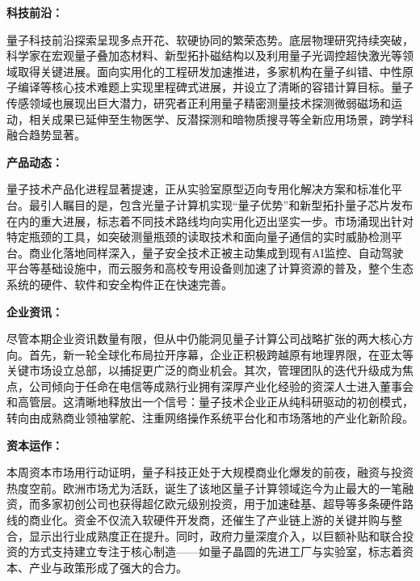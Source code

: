 \documentclass[12pt,a4paper]{ctexart}
\begin{document}
\textbf{ 科技前沿：}

量子科技前沿探索呈现多点开花、软硬协同的繁荣态势。底层物理研究持续突破，科学家在宏观量子叠加态材料、新型拓扑磁结构以及利用量子光调控超快激光等领域取得关键进展。面向实用化的工程研发加速推进，多家机构在量子纠错、中性原子编译等核心技术难题上实现里程碑式进展，并设立了清晰的容错计算目标。量子传感领域也展现出巨大潜力，研究者正利用量子精密测量技术探测微弱磁场和运动，相关成果已延伸至生物医学、反潜探测和暗物质搜寻等全新应用场景，跨学科融合趋势显著。


\textbf{ 产品动态：}

量子技术产品化进程显著提速，正从实验室原型迈向专用化解决方案和标准化平台。最引人瞩目的是，包含光量子计算机实现“量子优势”和新型拓扑量子芯片发布在内的重大进展，标志着不同技术路线均向实用化迈出坚实一步。市场涌现出针对特定瓶颈的工具，如突破测量瓶颈的读取技术和面向量子通信的实时威胁检测平台。商业化落地同样深入，量子安全技术正被主动集成到现有AI监控、自动驾驶平台等基础设施中，而云服务和高校专用设备则加速了计算资源的普及，整个生态系统的硬件、软件和安全构件正在快速完善。


\textbf{ 企业资讯：}

尽管本期企业资讯数量有限，但从中仍能洞见量子计算公司战略扩张的两大核心方向。首先，新一轮全球化布局拉开序幕，企业正积极跨越原有地理界限，在亚太等关键市场设立总部，以捕捉更广泛的商业机会。其次，管理团队的迭代升级成为焦点，公司倾向于任命在电信等成熟行业拥有深厚产业化经验的资深人士进入董事会和高管层。这清晰地释放出一个信号：量子技术企业正从纯科研驱动的初创模式，转向由成熟商业领袖掌舵、注重网络操作系统平台化和市场落地的产业化新阶段。


\textbf{ 资本运作：}

本周资本市场用行动证明，量子科技正处于大规模商业化爆发的前夜，融资与投资热度空前。欧洲市场尤为活跃，诞生了该地区量子计算领域迄今为止最大的一笔融资，而多家初创公司也获得超亿欧元级别投资，用于加速硅基、超导等多条硬件路线的商业化。资金不仅流入软硬件开发商，还催生了产业链上游的关键并购与整合，显示出行业成熟度正在提升。同时，政府力量深度介入，以巨额补贴和联合投资的方式支持建立专注于核心制造——如量子晶圆的先进工厂与实验室，标志着资本、产业与政策形成了强大的合力。
\end{document}
